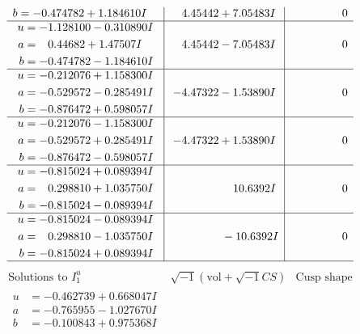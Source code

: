 \documentclass[1p]{elsarticle_modified}
\theoremstyle{definition}
\newcommand{\I}{\sqrt{-1}}
\begin{document}
$$\begin{array}{c|c|c}
\begin{aligned}
b &= -0.474782 + 1.184610 I\end{aligned}
 & \phantom{-}4.45442 + 7.05483 I & \phantom{-0.000000 } 0 \\ \hline\begin{aligned}
u &= -1.128100 - 0.310890 I \\
a &= \phantom{-}0.44682 + 1.47507 I \\
b &= -0.474782 - 1.184610 I\end{aligned}
 & \phantom{-}4.45442 - 7.05483 I & \phantom{-0.000000 } 0 \\ \hline\begin{aligned}
u &= -0.212076 + 1.158300 I \\
a &= -0.529572 - 0.285491 I \\
b &= -0.876472 + 0.598057 I\end{aligned}
 & -4.47322 - 1.53890 I & \phantom{-0.000000 } 0 \\ \hline\begin{aligned}
u &= -0.212076 - 1.158300 I \\
a &= -0.529572 + 0.285491 I \\
b &= -0.876472 - 0.598057 I\end{aligned}
 & -4.47322 + 1.53890 I & \phantom{-0.000000 } 0 \\ \hline\begin{aligned}
u &= -0.815024 + 0.089394 I \\
a &= \phantom{-}0.298810 + 1.035750 I \\
b &= -0.815024 - 0.089394 I\end{aligned}
 & \phantom{-0.000000 -}10.6392 I & \phantom{-0.000000 } 0 \\ \hline\begin{aligned}
u &= -0.815024 - 0.089394 I \\
a &= \phantom{-}0.298810 - 1.035750 I \\
b &= -0.815024 + 0.089394 I\end{aligned}
 & \phantom{-0.000000 } -10.6392 I & \phantom{-0.000000 } 0\\
 \hline 
 \end{array}$$\newpage$$\begin{array}{c|c|c}  
\text{Solutions to }I^u_{1}& \I (\text{vol} + \sqrt{-1}CS) & \text{Cusp shape}\\
 \hline 
\begin{aligned}
u &= -0.462739 + 0.668047 I \\
a &= -0.765955 - 1.027670 I \\
b &= -0.100843 + 0.975368 I\end{aligned}

\end{array}$$
\end{document}
